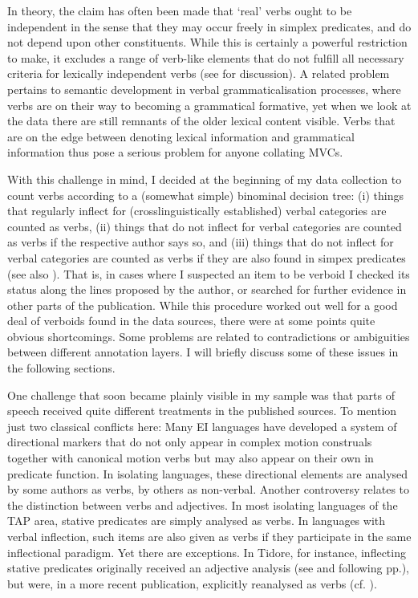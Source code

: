 In theory, the claim has often been made that `real' verbs ought to be independent in the sense that they may occur freely in simplex predicates, and do not depend upon other constituents. While this is certainly a powerful restriction to make, it excludes a range of verb-like elements that do not fulfill all necessary criteria for lexically independent verbs (see  for discussion). A related problem pertains to semantic development in verbal grammaticalisation processes, where verbs are on their way to becoming a grammatical formative, yet when we look at the data there are still remnants of the older lexical content visible. Verbs that are on the edge between denoting lexical information and grammatical information thus pose a serious problem for anyone collating MVCs.

With this challenge in mind, I decided at the beginning of my data collection to count verbs according to a (somewhat simple) binominal decision tree: (i) things that regularly inflect for (crosslinguistically established) verbal categories are counted as verbs, (ii) things that do not inflect for verbal categories are counted as verbs if the respective author says so, and (iii) things that do not inflect for verbal categories are counted as verbs if they are also found in simpex predicates (see also ). That is, in cases where I suspected an item to be verboid I checked its status along the lines proposed by the author, or searched for further evidence in other parts of the publication. While this procedure worked out well for a good deal of verboids found in the data sources, there were at some points quite obvious shortcomings. Some problems are related to contradictions or ambiguities between different annotation layers. I will briefly discuss some of these issues in the following sections.

One challenge that soon became plainly visible in my sample was that parts of speech received quite different treatments in the published sources. To mention just two classical conflicts here: Many EI languages have developed a system of directional markers that do not only appear in complex motion construals together with canonical motion verbs but may also appear on their own in predicate function. In isolating languages, these directional elements are analysed by some authors as verbs, by others as non-verbal. Another controversy relates to the distinction between verbs and adjectives. In most isolating languages of the TAP area, stative predicates are simply analysed as verbs. In languages with verbal inflection, such items are also given as verbs if they participate in the same inflectional paradigm. Yet there are exceptions. In Tidore, for instance, inflecting stative predicates originally received an adjective analysis (see \citealt[81]{vanstaden2000tidore} and following pp.), but were, in a more recent publication, explicitly reanalysed as verbs (cf. \citealt[46]{vanstaden2008serial}). 

